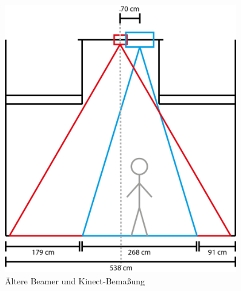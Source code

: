 \begin{figure}[htbp]
	\centering
		\includegraphics[width=0.9\textwidth]{images/TZ2.png}
	\caption{Ältere Beamer und Kinect-Bemaßung}
	\label{fig:TZ2}
\end{figure}

